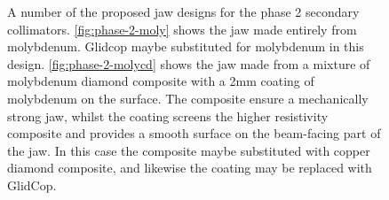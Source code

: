 \begin{figure}
\label{fig:phase-2-jaw-designs}
\caption{A number of the proposed jaw designs for the phase 2 secondary collimators. \ref{fig:phase-2-moly} shows the jaw made entirely from molybdenum. Glidcop maybe substituted for molybdenum in this design. \ref{fig:phase-2-molycd} shows the jaw made from a mixture of molybdenum diamond composite with a 2mm coating of molybdenum on the surface. The composite ensure a mechanically strong jaw, whilst the coating screens the higher resistivity composite and provides a smooth surface on the beam-facing part of the jaw. In this case the composite maybe substituted with copper diamond composite, and likewise the coating may be replaced with GlidCop.}
\end{figure}


